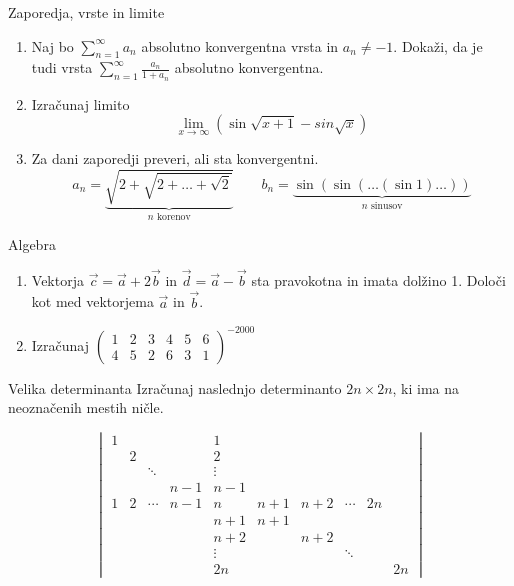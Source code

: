 \begin{frame}{Zaporedja, vrste in limite}
	\begin{enumerate}
		\item 
		Naj bo $\sum_{n=1}^\infty a_n$ absolutno konvergentna vrsta in $a_n \ne -1$.
		Dokaži, da je tudi vrsta $\sum_{n=1}^\infty \frac{a_n}{1+a_n}$
		absolutno konvergentna.

		\item
		Izračunaj limito
		$$\lim_{x \to\infty}\left(\sin\sqrt{x+1}-sin\sqrt{x}\right)$$

		\item
		Za dani zaporedji preveri, ali sta konvergentni.
		$$
		a_n = \underbrace{\sqrt{2+\sqrt{2+\dots+\sqrt{2}}}}_{n\text{ korenov}} \qquad
		b_n = \underbrace{\sin(\sin(\dots(\sin 1)\dots))}_{n\text{ sinusov}}
		$$



	\end{enumerate}
\end{frame}

\begin{frame}{Algebra}
	\begin{enumerate}
		\item
		Vektorja $\vec{c} = \vec{a} + 2\vec{b}$ in $\vec{d} = \vec{a} - \vec{b}$
		sta pravokotna in imata dolžino 1. Določi kot med vektorjema $\vec{a}$ in $\vec{b}$.
		\item 
		Izračunaj $\begin{pmatrix}
			1 & 2 & 3 & 4 & 5 & 6 \\
			4 & 5 & 2 & 6 & 3 & 1
			\end{pmatrix}^{-2000}$
		
	\end{enumerate}
\end{frame}

\begin{frame}{Velika determinanta}
	Izračunaj naslednjo determinanto $2n \times 2n$, ki ima na neoznačenih mestih ničle.
	
	$$
	\begin{vmatrix}
	1 &    &  		& 		 & 1	  	&		&		&		& & \\
	  & 2  &  		& 		 & 2		&		&		&		& & \\
	  &    & \ddots &  		 & \vdots	&		&		&		& & \\
	  &    &  		& n-1  	 & n-1		&		&		&		& & \\
	1 & 2  & \cdots & n-1	 & n		& n+1	& n+2	&		\cdots & 2n \\
	  &    &  		& 		 & n+1		& n+1	& 		&		& & \\
	  &    &  		& 		 & n+2		&		& n+2	&		& & \\
	  &    &  		& 		 & \vdots	&		&		&		\ddots & \\
	  &    & 		& 		 & 2n		&		&		&		& & 2n
	\end{vmatrix}
	$$
	
\end{frame}

